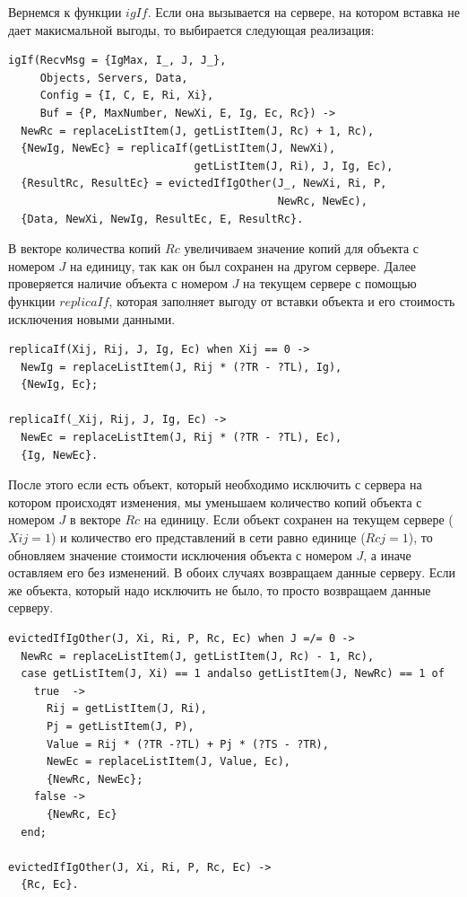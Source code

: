			Вернемся к функции $igIf$. Если она вызывается на сервере, на котором вставка не дает макисмальной выгоды, то выбирается следующая реализация:
			\begin{lstlisting}
igIf(RecvMsg = {IgMax, I_, J, J_}, 
     Objects, Servers, Data,
     Config = {I, C, E, Ri, Xi},
     Buf = {P, MaxNumber, NewXi, E, Ig, Ec, Rc}) ->
  NewRc = replaceListItem(J, getListItem(J, Rc) + 1, Rc),
  {NewIg, NewEc} = replicaIf(getListItem(J, NewXi), 
                             getListItem(J, Ri), J, Ig, Ec),
  {ResultRc, ResultEc} = evictedIfIgOther(J_, NewXi, Ri, P, 
                                          NewRc, NewEc),
  {Data, NewXi, NewIg, ResultEc, E, ResultRc}.				
			\end{lstlisting}
			В векторе количества копий $Rc$ увеличиваем значение копий для объекта с номером $J$ на единицу, так как он был сохранен на другом сервере. Далее проверяется наличие объекта с 
			номером $J$ на текущем сервере с помощью функции $replicaIf$, которая заполняет выгоду от вставки объекта и его стоимость исключения новыми данными. 
			\begin{lstlisting}
replicaIf(Xij, Rij, J, Ig, Ec) when Xij == 0 -> 
  NewIg = replaceListItem(J, Rij * (?TR - ?TL), Ig),
  {NewIg, Ec};

replicaIf(_Xij, Rij, J, Ig, Ec) ->
  NewEc = replaceListItem(J, Rij * (?TR - ?TL), Ec),
  {Ig, NewEc}.				
			\end{lstlisting}
			После этого если есть объект, который необходимо исключить с сервера на котором происходят изменения, мы уменьшаем количество копий объекта с номером $J$ в векторе $Rc$ на единицу.
			Если объект сохранен на текущем сервере ($Xij = 1$) и количество его представлений в сети равно единице ($Rcj = 1$), то обновляем значение стоимости исключения объекта с номером $J$,
			а иначе оставляем его без изменений. В обоих случаях возвращаем данные серверу. Если же объекта, который надо исключить не было, то просто возвращаем данные серверу.
			\begin{lstlisting}
evictedIfIgOther(J, Xi, Ri, P, Rc, Ec) when J =/= 0 ->
  NewRc = replaceListItem(J, getListItem(J, Rc) - 1, Rc),
  case getListItem(J, Xi) == 1 andalso getListItem(J, NewRc) == 1 of
    true  -> 
      Rij = getListItem(J, Ri),
      Pj = getListItem(J, P),
      Value = Rij * (?TR -?TL) + Pj * (?TS - ?TR),
      NewEc = replaceListItem(J, Value, Ec),
      {NewRc, NewEc};
    false -> 
      {NewRc, Ec}
  end;

evictedIfIgOther(J, Xi, Ri, P, Rc, Ec) -> 
  {Rc, Ec}.				
			\end{lstlisting}
